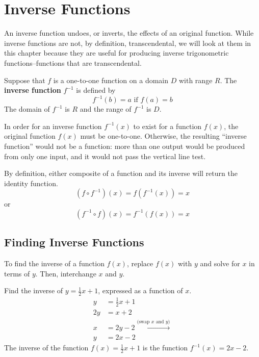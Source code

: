 \section{Inverse Functions}

An inverse function undoes, or inverts, the effects of an original function.
While inverse functions are not, by definition, transcendental, we will look at them in this chapter because they are useful for producing inverse trigonometric functions--functions that are transcendental.
\begin{defn}
  Suppose that \(f\) is a one-to-one function on a domain $D$ with range $R$. The \textbf{inverse function} $f^{-1}$ is defined by
  \[ f^{-1}(b)=a \text{ if } f(a)=b \]
  The domain of $f^{-1}$ is $R$ and the range of $f^{-1}$ is $D$.
\end{defn}
In order for an inverse function $f^{-1}(x)$ to exist for a function $f(x)$, the original function $f(x)$ must be one-to-one. Otherwise, the resulting ``inverse function'' would not be a function: more than one output would be produced from only one input, and it would not pass the vertical line test.
\begin{remark} 
  By definition, either composite of a function and its inverse will return the identity function.
  \[ (f \circ f^{-1})(x)=f(f^{-1}(x))=x \]
  or
  \[ (f^{-1} \circ f)(x)=f^{-1}(f(x))=x \]
\end{remark}

\subsection{Finding Inverse Functions}
To find the inverse of a function $f(x)$, replace $f(x)$ with $y$ and solve for $x$ in terms of $y$. Then, interchange $x$ and $y$.
\begin{ex}
  Find the inverse of $y=\frac{1}{2}x+1$, expressed as a function of $x$.
  \begin{align*}
    y &= \frac{1}{2}x+1 \\
    2y &= x + 2 \\
    x &= 2y -2 \xrightarrow{\text{(swap $x$ and $y$)}} \\
    y &=2x-2
  \end{align*}
  The inverse of the function $f(x)=\frac{1}{2}x+1$ is the function $f^{-1}(x)=2x-2$.
\end{ex}



